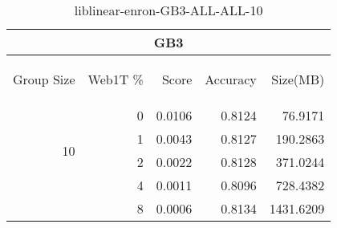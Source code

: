 \begin{center}
\begin{table}[htbp] 
 \begin{center}
\begin{tabular}{ | r | r | r | r | r |}
\hline
\multicolumn{5}{|c|}{GB3}\\
\hline
\begin{sideways}Group Size\end{sideways} & \begin{sideways}Web1T \%\end{sideways} & \begin{sideways}Score\end{sideways} & \begin{sideways}Accuracy\end{sideways} & \begin{sideways}Size(MB)\end{sideways}\\
\hline
\multirow{4}{*}{10}
 & 0 & 0.0106 & 0.8124 & 76.9171\\ \cline{2-5}
 & 1 & 0.0043 & 0.8127 & 190.2863\\ \cline{2-5}
 & 2 & 0.0022 & 0.8128 & 371.0244\\ \cline{2-5}
 & 4 & 0.0011 & 0.8096 & 728.4382\\ \cline{2-5}
 & 8 & 0.0006 & 0.8134 & 1431.6209\\ \cline{2-5}
\hline
\end{tabular}
\caption{liblinear-enron-GB3-ALL-ALL-10}
\label{table:liblinear-enron-GB3-ALL-ALL-10}
\end{center}
 \end{table}
\end{center}

